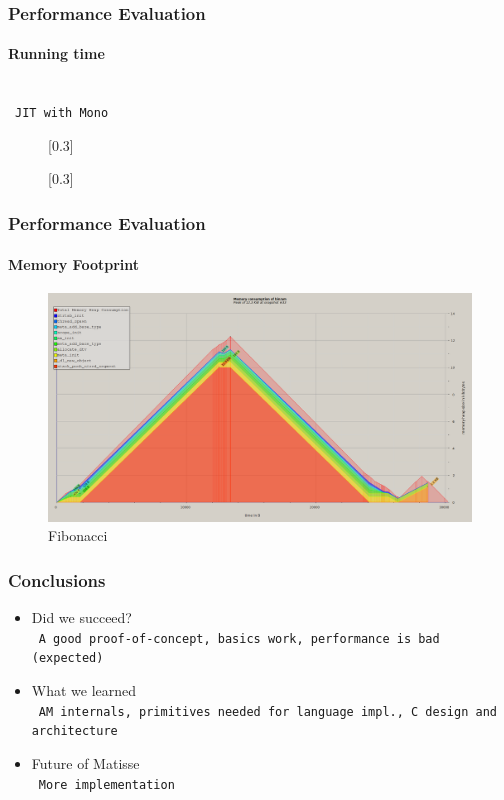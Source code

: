 \documentclass[handout]{beamer}
\newcommand{\n}[1]{\leavevmode\\~\texttt{\color{red}\tiny #1}}
\begin{document}
\begin{frame}
  \frametitle{Performance Evaluation}
  \framesubtitle{Running time}

  \n{JIT with Mono}

  \begin{figure}
    \centering
    \begin{minipage}{.5\textwidth}
      \centering
          \scalebox{0.36}[0.3]{}
    \end{minipage}%
    \begin{minipage}{.5\textwidth}
      \centering
          \scalebox{0.36}[0.3]{}
    \end{minipage}
  \end{figure}
\end{frame}

\begin{frame}
  \frametitle{Performance Evaluation}
  \framesubtitle{Memory Footprint}

  \begin{figure}[H]
    \centering
    \includegraphics[scale=0.23]{../figures/fig-mem}
    \caption{Fibonacci}
  \end{figure}
\end{frame}

\begin{frame}
  \frametitle{Conclusions}

  \begin{itemize}
  \item Did we succeed?
    \n{A good proof-of-concept, basics work, performance is bad (expected)}
  \item What we learned
    \n{AM internals, primitives needed for language impl., C design and architecture}
  \item Future of Matisse
    \n{More implementation}
  \end{itemize}
\end{frame}
\end{document}
